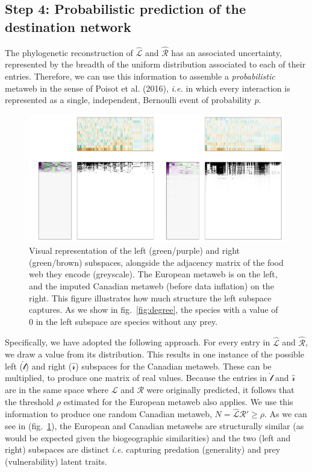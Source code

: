 \documentclass[10pt,oneside]{article}
\makeatletter
\def\maxwidth{\ifdim\Gin@nat@width>\linewidth\linewidth
\else\Gin@nat@width\fi}
\let\Oldincludegraphics\includegraphics
\renewcommand{\includegraphics}[1]{\Oldincludegraphics[width=\maxwidth]{#1}}
\makeatother
\begin{document}
\hypertarget{step-4-probabilistic-prediction-of-the-destination-network}{%
\subsection{Step 4: Probabilistic prediction of the destination
network}\label{step-4-probabilistic-prediction-of-the-destination-network}}

The phylogenetic reconstruction of \(\hat{\mathscr{L}}\) and
\(\hat{\mathscr{R}}\) has an associated uncertainty, represented by the
breadth of the uniform distribution associated to each of their entries.
Therefore, we can use this information to assemble a
\emph{probabilistic} metaweb in the sense of Poisot et al. (2016),
\emph{i.e.} in which every interaction is represented as a single,
independent, Bernoulli event of probability \(p\).

\begin{figure}
\hypertarget{fig:subspaces}{%
\centering
\includegraphics{figures/figure-subspaces.png}
\caption{Visual representation of the left (green/purple) and right
(green/brown) subspaces, alongside the adjacency matrix of the food web
they encode (greyscale). The European metaweb is on the left, and the
imputed Canadian metaweb (before data inflation) on the right. This
figure illustrates how much structure the left subspace captures. As we
show in fig.~\ref{fig:degree}, the species with a value of 0 in the left
subspace are species without any prey.}\label{fig:subspaces}
}
\end{figure}

Specifically, we have adopted the following approach. For every entry in
\(\hat{\mathscr{L}}\) and \(\hat{\mathscr{R}}\), we draw a value from
its distribution. This results in one instance of the possible left
(\(\hat{\mathscr{l}}\)) and right (\(\hat{\mathscr{r}}\)) subspaces for
the Canadian metaweb. These can be multiplied, to produce one matrix of
real values. Because the entries in \(\hat{\mathscr{l}}\) and
\(\hat{\mathscr{r}}\) are in the same space where \(\mathscr{L}\) and
\(\mathscr{R}\) were originally predicted, it follows that the threshold
\(\rho\) estimated for the European metaweb also applies. We use this
information to produce one random Canadian metaweb,
\(N = \hat{\mathscr{L}}\hat{\mathscr{R}}' \ge \rho\). As we can see in
(fig.~\ref{fig:subspaces}), the European and Canadian metawebs are
structurally similar (as would be expected given the biogeographic
similarities) and the two (left and right) subspaces are distinct
\emph{i.e.} capturing predation (generality) and prey (vulnerability)
latent traits.
\end{document}
